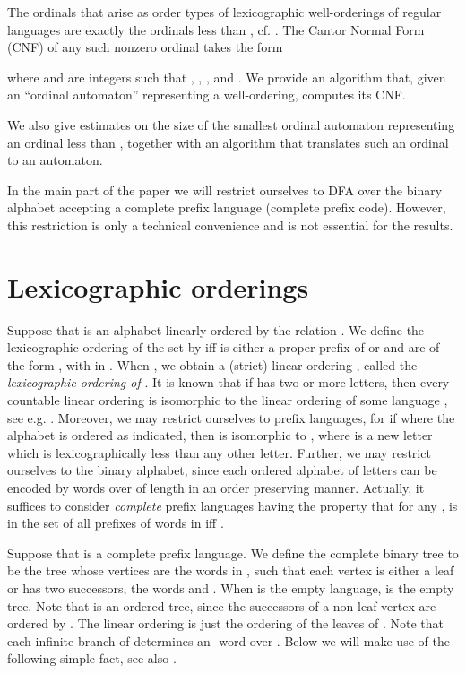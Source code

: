 \documentclass[copyright]{eptcs}
\begin{document}
The ordinals that arise as order types of lexicographic well-orderings 
of regular languages are exactly the ordinals less than ,
cf. \cite{BEord,Heilbrunner}. 
The Cantor Normal Form (CNF) \cite{Rosenstein} of any such nonzero ordinal 
takes the form

where  and  are integers such that ,
, , and .
We provide an algorithm that, given an ``ordinal automaton'' 
representing a well-ordering, computes its CNF. 

We also give estimates on the size of the smallest ordinal automaton
representing an ordinal less than , together with
an algorithm that translates such an ordinal to an automaton.

In the main part of the paper we will restrict ourselves to DFA over
the binary alphabet  accepting a complete prefix language 
(complete prefix code). However, this restriction  
is only a technical convenience and is not essential for the results.


 


\section{Lexicographic orderings}


Suppose that  is an alphabet linearly ordered by the relation .
We define the lexicographic ordering  of the set  
by  iff  is either a proper prefix of  or  and  
are of the form ,  with  in .
When , we obtain a (strict) linear ordering 
, called the \emph{lexicographic ordering of }.
 It is known that if  has two or more letters,
then every countable linear ordering is isomorphic to the
linear ordering  of some language 
, see e.g. \cite{BEord}. 
Moreover, we may restrict ourselves to prefix 
languages,
for if  where the 
alphabet is ordered as indicated, then   is isomorphic to ,
where  is a new letter which is  lexicographically less than any other letter.
Further, we may restrict ourselves to the binary alphabet, 
since each ordered alphabet of  letters can be encoded by words 
over  of  length  in an order preserving 
manner. 
Actually, it suffices to consider 
\emph{complete} prefix languages  having the 
property that for any ,  is in the set  
of all prefixes of words in  iff . 

Suppose that  is a complete prefix language.
We define the complete binary tree  to be the tree whose 
vertices are the words in , 
such that each vertex  is either a leaf or has 
two successors, the words  and . When  is the 
empty language,  is the empty tree. Note that  
is an ordered tree, since the successors  
of a non-leaf vertex  are ordered by . 
The linear ordering  is just the ordering 
of the leaves of . Note that each infinite branch
of  determines an -word over . 
Below we will make use of the following 
simple fact, see also \cite{Carayoletal}. 
\end{document}
